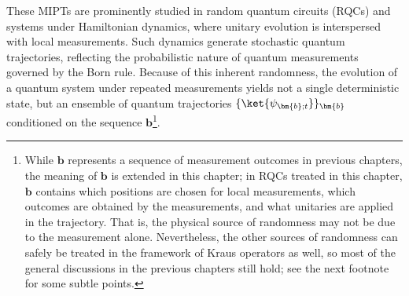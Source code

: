 \documentclass[preprint,pteplogo]{ptephy_v2}%
\numberwithin{equation}{section}
\theoremstyle{definition}
\begin{document}
These MIPTs are prominently studied in random quantum circuits (RQCs) and systems under Hamiltonian dynamics, where unitary evolution is interspersed with local measurements.
Such dynamics generate stochastic quantum trajectories, reflecting the probabilistic nature of quantum measurements governed by the Born rule.
Because of this inherent randomness, the evolution of a quantum system under repeated measurements yields not a single deterministic state, but an ensemble of quantum trajectories $\{\ket{\psi_{\bm{b};t}}\}_{\bm{b}}$ conditioned on the sequence $\bm{b}$\footnote{\label{f:b-continuous}
While $\bm{b}$ represents a sequence of measurement outcomes in previous chapters, the meaning of $\bm{b}$ is extended in this chapter;
in RQCs treated in this chapter, $\bm{b}$ contains which positions are chosen for local measurements, which outcomes are obtained by the measurements, and what unitaries are applied in the trajectory.
That is, the physical source of randomness may not be due to the measurement alone.
Nevertheless, the other sources of randomness can safely be treated in the framework of Kraus operators as well, so most of the general discussions in the previous chapters still hold;
see the next footnote for some subtle points.
}.
\end{document}
